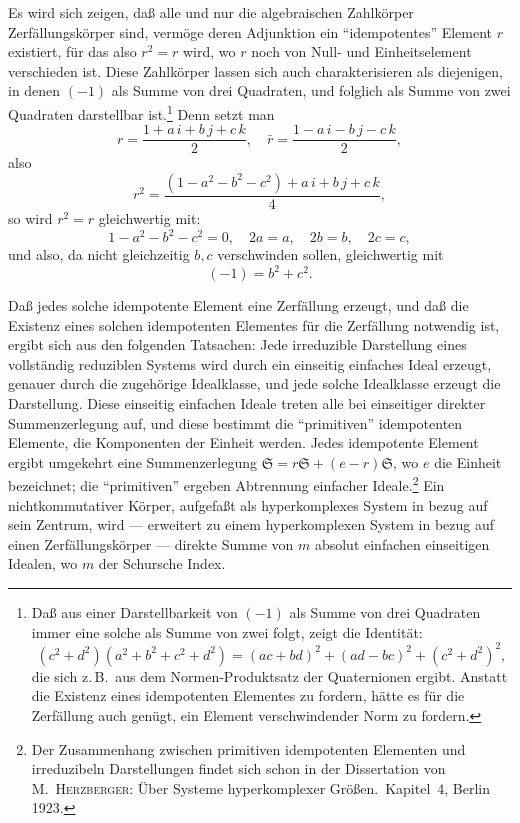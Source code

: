 \documentclass[12pt,a4paper]{article}
\theoremstyle{definition}
\begin{document}
Es wird sich zeigen, da\ss{} alle und nur die algebraischen Zahlk\"orper
Zerf\"allungsk\"orper sind, verm\"oge deren Adjunktion ein ``idempotentes''
Element $r$ existiert, f\"ur das also $r^2 = r$ wird, wo $r$ noch von
Null- und Einheitselement verschieden ist. Diese Zahlk\"orper lassen sich
auch charakterisieren als diejenigen, in denen $(-1)$ als Summe von drei
Quadraten, und folglich als Summe von zwei Quadraten darstellbar
ist.\footnote{Da\ss{} aus einer Darstellbarkeit von $(-1)$ als Summe von
drei Quadraten immer eine solche als Summe von zwei folgt, zeigt die
Identit\"at:
\[
(c^2+d^2)(a^2+b^2+c^2+d^2) = (ac+bd)^2 + (ad-bc)^2 + (c^2+d^2)^2,
\]
die sich z.\,B.\ aus dem Normen-Produktsatz der Quaternionen ergibt.
Anstatt die Existenz eines idempotenten Elementes zu fordern, h\"atte es
f\"ur die Zerf\"allung auch gen\"ugt, ein Element verschwindender Norm zu
fordern.} Denn setzt man
\[
r = \frac{1+a\,i+b\,j+c\,k}{2}, \quad
\bar{r} = \frac{1-a\,i-b\,j-c\,k}{2},
\]
also
\[
r^2 = \frac{(1-a^2-b^2-c^2) + a\,i + b\,j + c\,k}{4},
\]
so wird $r^2 = r$ gleichwertig mit:
\[
1-a^2-b^2-c^2 = 0, \quad 2a = a, \quad 2b = b, \quad 2c = c,
\]
und also, da nicht gleichzeitig $b,c$ verschwinden sollen, gleichwertig mit
\[
(-1) = b^2 + c^2.
\]

Da\ss{} jedes solche idempotente Element eine Zerf\"allung erzeugt, und da\ss{}
die Existenz eines solchen idempotenten Elementes f\"ur die Zerf\"allung
notwendig ist, ergibt sich aus den folgenden Tatsachen: Jede irreduzible
Darstellung eines vollst\"andig reduziblen Systems wird durch ein
einseitig einfaches Ideal erzeugt, genauer durch die zugeh\"orige
Idealklasse, und jede solche Idealklasse erzeugt die Darstellung. Diese
einseitig einfachen Ideale treten alle bei einseitiger direkter
Summenzerlegung auf, und diese bestimmt die ``primitiven'' idempotenten
Elemente, die Komponenten der Einheit werden. Jedes idempotente Element
ergibt umgekehrt eine Summenzerlegung $\mathfrak{S} = r\mathfrak{S} +
(e-r)\mathfrak{S}$, wo $e$ die Einheit bezeichnet; die ``primitiven''
ergeben Abtrennung einfacher Ideale.\footnote{Der Zusammenhang zwischen
primitiven idempotenten Elementen und irreduzibeln Darstellungen findet
sich schon in der Dissertation von M.\ \textsc{Herzberger}: \"Uber Systeme
hyperkomplexer Gr\"o\ss en.\ Kapitel~4, Berlin 1923.} Ein nichtkommutativer
K\"orper, aufgefa\ss t als hyperkomplexes System in bezug auf sein
Zentrum, wird --- erweitert zu einem hyperkomplexen System in bezug auf
einen Zerf\"allungsk\"orper --- direkte Summe von $m$ absolut einfachen
einseitigen Idealen, wo $m$ der Schursche Index.
\end{document}
